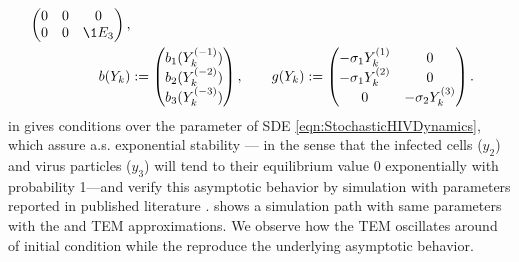 \begin{example}
\begin{align}
\begin{pmatrix}
			0		&0			&0\\
			0		&0			&\1{E_3}\\
		\end{pmatrix},
	\notag
	\\
	b(Y_k) &:=
	\begin{pmatrix}
		b_1(Y_k^{(-1)})\\
		b_2(Y_k^{(-2)})\\
		b_3(Y_k^{(-3)})
	\end{pmatrix},
	\qquad
	g(Y_k):=
	\begin{pmatrix}
		-\sigma_1 Y_k^{(1)}	&0\\
		-\sigma_1 Y_k^{(2)}	&0\\
		0	&-\sigma_2 Y_k^{(3)}
	\end{pmatrix}.
\end{align}
%
	\citeauthor{Dalal2008} in \cite[Thm 5.1]{Dalal2008} gives conditions over the parameter of SDE 
	\eqref{eqn:StochasticHIVDynamics}, which assure a.s. exponential stability --- in the sense that
	the infected cells ($y_2$) and virus particles ($y_3$) will tend to their equilibrium value 0 exponentially with 
	probability 1---and verify this asymptotic behavior by
	simulation %
	with parameters reported in published literature \cite{Bonhoeffer1997, Callaway2002, Nelson2000, Nowak1997}.
	 shows a simulation path with same parameters with the \SM and TEM approximations.
	We observe how the TEM oscillates around of initial condition while the \SM reproduce the underlying asymptotic
	behavior.
\end{example}

